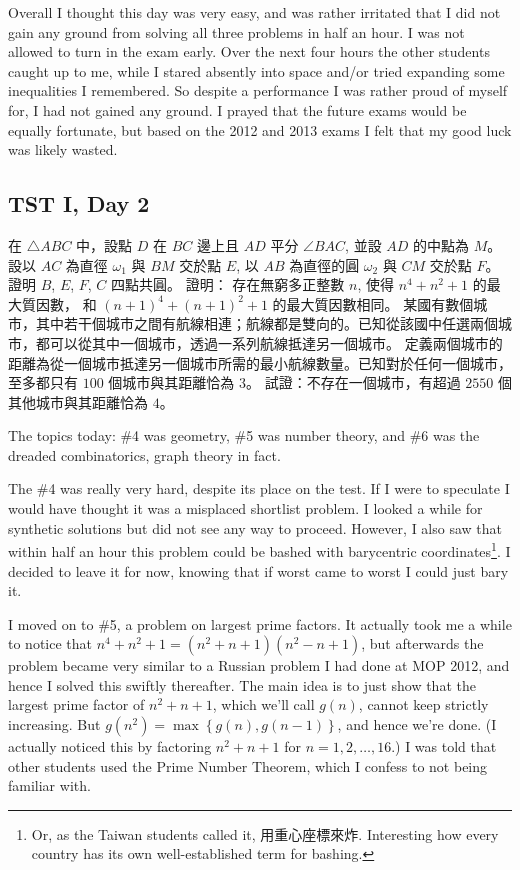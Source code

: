 \documentclass[11pt]{scrreprt}
\begin{document}
Overall I thought this day was very easy, and was rather irritated that I did not gain any ground from solving all three problems in half an hour.  I was not allowed to turn in the exam early. Over the next four hours the other students caught up to me, while I stared absently into space and/or tried expanding some inequalities I remembered. So despite a performance I was rather proud of myself for, I had not gained any ground. I prayed that the future exams would be equally fortunate, but based on the 2012 and 2013 exams I felt that my good luck was likely wasted.

\subsection{TST I, Day 2}
\begin{enumerate}
  \setcounter{enumi}{3}
  \ii 在 $\triangle ABC$ 中，設點 $D$ 在 $BC$ 邊上且 $AD$ 平分 $\angle BAC$, 並設 $AD$ 的中點為 $M$。
  設以 $AC$ 為直徑 $\omega_1$ 與 $BM$ 交於點 $E$, 以 $AB$ 為直徑的圓 $\omega_2$ 與 $CM$ 交於點 $F$。
  證明 $B$, $E$, $F$, $C$ 四點共圓。
  \ii 證明： 存在無窮多正整數 $n$, 使得 $n^4+n^2+1$ 的最大質因數， 和 $(n+1)^4+(n+1)^2+1$ 的最大質因數相同。 %
  \ii 某國有數個城市，其中若干個城市之間有航線相連；航線都是雙向的。已知從該國中任選兩個城市，都可以從其中一個城市，透過一系列航線抵達另一個城市。
  定義兩個城市的距離為從一個城市抵達另一個城市所需的最小航線數量。已知對於任何一個城市，至多都只有 $100$ 個城市與其距離恰為 $3$。
  試證：不存在一個城市，有超過 $2550$ 個其他城市與其距離恰為 $4$。%
\end{enumerate}
The topics today: \#4 was geometry, \#5 was number theory, and \#6 was the dreaded combinatorics, graph theory in fact.

The \#4 was really very hard, despite its place on the test. If I were to speculate I would have thought it was a misplaced shortlist problem. I looked a while for synthetic solutions but did not see any way to proceed. However, I also saw that within half an hour this problem could be bashed with barycentric coordinates\footnote{Or, as the Taiwan students called it, 用重心座標來炸. Interesting how every country has its own well-established term for bashing.}. I decided to leave it for now, knowing that if worst came to worst I could just bary it.

I moved on to \#5, a problem on largest prime factors. It actually took me a while to notice that $n^4+n^2+1=(n^2+n+1)(n^2-n+1)$, but afterwards the problem became very similar to a Russian problem I had done at MOP 2012, and hence I solved this swiftly thereafter. The main idea is to just show that the largest prime factor of $n^2+n+1$, which we'll call $g(n)$, cannot keep strictly increasing.  But $g(n^2) = \max \left\{ g(n), g(n-1) \right\}$, and hence we're done. (I actually noticed this by factoring $n^2+n+1$ for $n=1,2,\dots,16$.) I was told that other students used the Prime Number Theorem, which I confess to not being familiar with.
\end{document}
